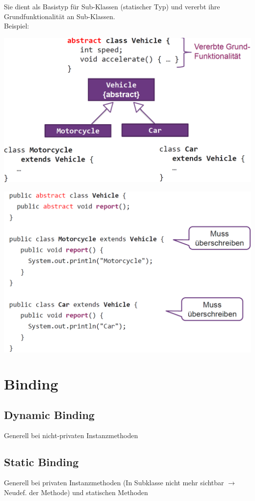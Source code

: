 Sie dient als Basistyp für Sub-Klassen (statischer Typ) und vererbt ihre Grundfunktionalität an Sub-Klassen.\\
Beispiel:\\
\begin{minipage}{0.5\columnwidth}
    \begin{center}
        \includegraphics[width=0.9\columnwidth]{pictures/abstrakte-Klasse-Bsp.png}
    \end{center}
\end{minipage}
\hfill
\begin{minipage}{0.5\columnwidth}
    \begin{center}
        \includegraphics[width=0.9\columnwidth]{pictures/abstrakte-Klasse-Bsp2.png}
    \end{center}
\end{minipage}

\section{Binding}
\subsection{Dynamic Binding}
Generell bei nicht-privaten Instanzmethoden

\subsection{Static Binding}
Generell bei privaten Instanzmethoden (In Subklasse nicht mehr sichtbar $\rightarrow$ Neudef. der Methode) und statischen Methoden


